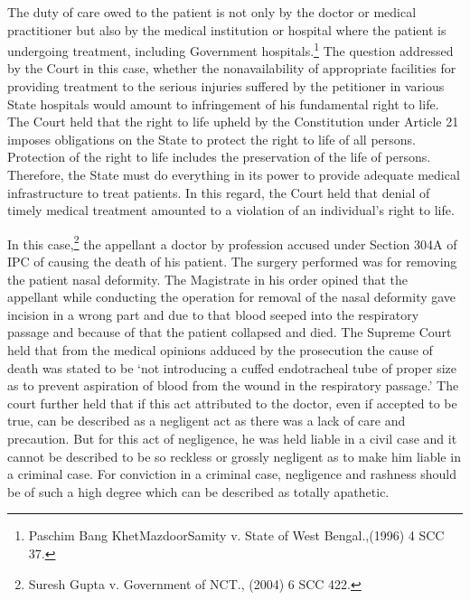 \begin{multicols}{2}

\noi
The duty of care owed to the patient is not only by the doctor or medical practitioner but also by
the medical institution or hospital where the patient is undergoing treatment, including
Government hospitals.\footnote{Paschim Bang KhetMazdoorSamity v. State of West Bengal.,(1996) 4 SCC 37.} The question addressed by the Court in this case, whether the nonavailability of appropriate facilities for providing treatment to the serious injuries suffered by the
petitioner in various State hospitals would amount to infringement of his fundamental right to
life. The Court held that the right to life upheld by the Constitution under Article 21 imposes
obligations on the State to protect the right to life of all persons. Protection of the right to life
includes the preservation of the life of persons. Therefore, the State must do everything in its
power to provide adequate medical infrastructure to treat patients. In this regard, the Court held
that denial of timely medical treatment amounted to a violation of an individual’s right to life. 

\vspace{-.2cm}


\vspace{-.1cm}

\noi
In this case,\footnote{Suresh Gupta v. Government of NCT., (2004) 6 SCC 422.} the appellant a doctor by profession accused under Section 304A of IPC of causing the death of his patient. The surgery performed was for removing the patient nasal deformity. The Magistrate in his order opined that the appellant while conducting the operation for removal of the nasal deformity gave incision in a wrong part and due to that blood seeped into the respiratory passage and because of that the patient collapsed and died. The Supreme Court held that from the
medical opinions adduced by the prosecution the cause of death was stated to be `not introducing
a cuffed endotracheal tube of proper size as to prevent aspiration of blood from the wound in the
respiratory passage.’ The court further held that if this act attributed to the doctor, even if accepted
to be true, can be described as a negligent act as there was a lack of care and precaution. But for
this act of negligence, he was held liable in a civil case and it cannot be described to be so reckless
or grossly negligent as to make him liable in a criminal case. For conviction in a criminal case,
negligence and rashness should be of such a high degree which can be described as totally
apathetic.


\end{multicols}
